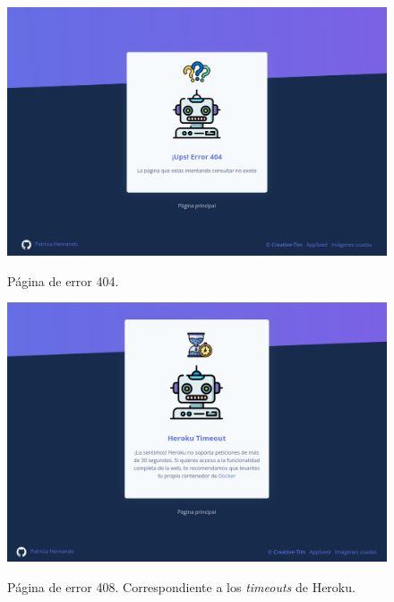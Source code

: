 \begin{figure}[h]
	\caption[Manual de usuario: error 404]{Página de error 404.}
	\centering
	\includegraphics[width=\textwidth]{../img/anexos/user_guide/0_error_404}
	\label{e-0:error-404}
\end{figure}

\begin{figure}[h]
	\caption[Manual de usuario: error 408]{Página de error 408. Correspondiente a los \textit{timeouts} de Heroku.}
	\centering
	\includegraphics[width=\textwidth]{../img/anexos/user_guide/0_error_408}
	\label{e-0:error-408}
\end{figure}

